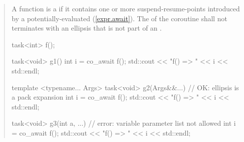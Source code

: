 \begin{quote}
\pnum
A function is a  if it contains
one or more suspend-resume-points introduced by a potentially-evaluated  (\ref{expr.await}).
The  of the coroutine shall not terminates with an ellipsis that is not part of an . 




\pnum
\enterexample
\begin{codeblock}
  task<int> f();
  
  task<void> g1() {
    int i = co_await f();
    std::cout << "f() => " << i << std::endl;
  }

  template <typename... Args>
  task<void> g2(Args&&...) { // OK: ellipsis is a pack expansion
    int i = co_await f();
    std::cout << "f() => " << i << std::endl;
  }

  task<void> g3(int a, ...) { // error: variable parameter list not allowed
    int i = co_await f();
    std::cout << "f() => " << i << std::endl;
  }

\end{codeblock}
\exitexample
%
%  
%    



\end{quote}
